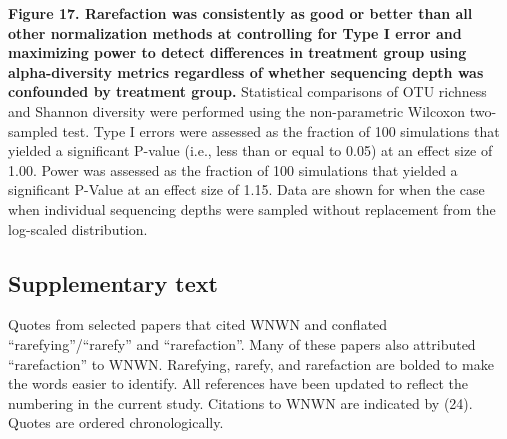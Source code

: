 \documentclass[
]{article}
\begin{document}
\textbf{Figure 17. Rarefaction was consistently as good or better than
all other normalization methods at controlling for Type I error and
maximizing power to detect differences in treatment group using
alpha-diversity metrics regardless of whether sequencing depth was
confounded by treatment group.} Statistical comparisons of OTU richness
and Shannon diversity were performed using the non-parametric Wilcoxon
two-sampled test. Type I errors were assessed as the fraction of 100
simulations that yielded a significant P-value (i.e., less than or equal
to 0.05) at an effect size of 1.00. Power was assessed as the fraction
of 100 simulations that yielded a significant P-Value at an effect size
of 1.15. Data are shown for when the case when individual sequencing
depths were sampled without replacement from the log-scaled
distribution.

\newpage

\hypertarget{supplementary-text}{%
\subsection{Supplementary text}\label{supplementary-text}}

Quotes from selected papers that cited WNWN and conflated
``rarefying''/``rarefy'' and ``rarefaction''. Many of these papers also
attributed ``rarefaction'' to WNWN. Rarefying, rarefy, and rarefaction
are bolded to make the words easier to identify. All references have
been updated to reflect the numbering in the current study. Citations to
WNWN are indicated by (24). Quotes are ordered chronologically.
\end{document}
